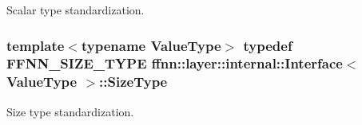 Scalar type standardization. 

\hypertarget{classffnn_1_1layer_1_1internal_1_1_interface_af0567642f60c65b5e87067226a54174b}{
\subsubsection[{Size\-Type}]{\setlength{\rightskip}{0pt plus 5cm}template$<$typename Value\-Type$>$ typedef {\bf F\-F\-N\-N\-\_\-\-S\-I\-Z\-E\-\_\-\-T\-Y\-P\-E} {\bf ffnn\-::layer\-::internal\-::\-Interface}$<$ Value\-Type $>$\-::{\bf Size\-Type}}}\label{classffnn_1_1layer_1_1internal_1_1_interface_af0567642f60c65b5e87067226a54174b}


Size type standardization. 




